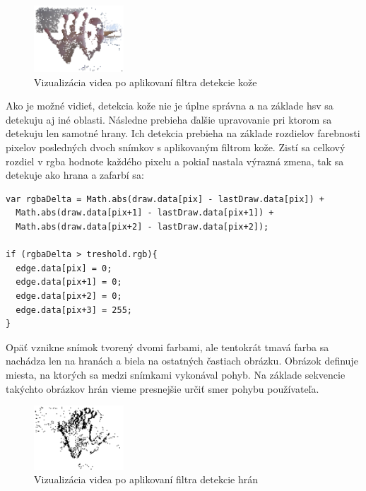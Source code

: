 \begin{figure}[H]
  \centering
  \includegraphics[width=0.3\textwidth]{img/motion/skin.png}
  \caption[Vizualizácia videa po aplikovaní filtra detekcie kože]{
    Vizualizácia videa po aplikovaní filtra detekcie kože}
  \label{fig: motion-skin}
\end{figure}

Ako je možné vidieť, detekcia kože nie je úplne správna a na základe hsv sa detekuju aj iné oblasti. Následne prebieha ďalšie upravovanie pri ktorom sa detekuju len samotné hrany. Ich detekcia prebieha na základe rozdielov farebnosti pixelov posledných dvoch snímkov \cite{MotionIllumination} s aplikovaným filtrom kože. Zistí sa celkový rozdiel v rgba hodnote každého pixelu a pokiaľ nastala výrazná zmena, tak sa detekuje ako hrana a zafarbí sa:

\begin{lstlisting}
var rgbaDelta = Math.abs(draw.data[pix] - lastDraw.data[pix]) +
  Math.abs(draw.data[pix+1] - lastDraw.data[pix+1]) +
  Math.abs(draw.data[pix+2] - lastDraw.data[pix+2]);

if (rgbaDelta > treshold.rgb){
  edge.data[pix] = 0;
  edge.data[pix+1] = 0;
  edge.data[pix+2] = 0;
  edge.data[pix+3] = 255;
}
\end{lstlisting}

Opäť vznikne snímok tvorený dvomi farbami, ale tentokrát tmavá farba sa nachádza len na hranách a biela na ostatných častiach obrázku. Obrázok definuje miesta, na ktorých sa medzi snímkami vykonával pohyb. Na základe sekvencie takýchto obrázkov hrán vieme presnejšie určiť smer pohybu používateľa.

\begin{figure}[H]
  \centering
  \includegraphics[width=0.3\textwidth]{img/motion/edges.png}
  \caption[Vizualizácia videa po aplikovaní filtra detekcie hrán]{
    Vizualizácia videa po aplikovaní filtra detekcie hrán}
  \label{fig: motion-edges}
\end{figure}

